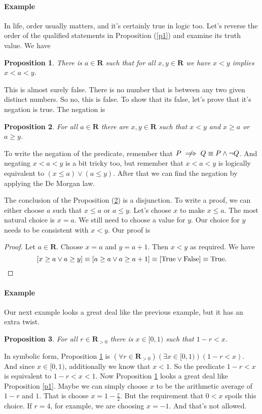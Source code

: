 \documentclass[12pt,fleqn]{article}
\newcommand{\reals}{\mathbf{R}}
\newcommand{\true}{\mathrm{True}}
\newcommand{\false}{\mathrm{False}}
\newcommand{\notimplies}{\centernot\implies}
\newenvironment{myproof}
  {\begin{shaded}\begin{proof}}
  {\end{proof}\end{shaded}}
\newtheorem{prop}{Proposition}
\newcounter{ex}\setcounter{ex}{0}
\newcommand{\ex}{%
\setcounter{ex}{\value{ex}+1}
\paragraph{Example \theex}}
\begin{document}
 \ex In life, order usually matters, and it's certainly true in logic too.
 Let's reverse the order of the qualified statements in Proposition 
 (\ref{p1}) and examine its truth value. We have 

 \begin{prop}
  There is $a \in \reals$ such that for all $x,y \in \reals$ we have
    $x < y$ implies $x<a<y$. \label{p2}   
\end{prop}
This is almost surely false. There is no number that is between 
any two given distinct numbers. So no, this is false. To show that its false,
let's prove that it's negation is true. The negation is

\begin{prop}
  For all $a \in \reals$ there are  $x,y \in \reals$ such that
    $x < y$ and  $x \geq a$ or $a \geq y$. \label{p3} 
\end{prop}
To write the negation of the predicate, remember that
$P \notimplies Q \equiv P \land \lnot Q$. And negating $x<a<y$ is 
a bit tricky too, but remember that 
$x<a<y$ is logically equivalent to $(x \leq a) \lor (a \leq y)$. After that 
we can find the negation by applying the De Morgan law.

The conclusion of the Proposition (\ref{p3}) is a disjunction.
To write a proof, we can either choose $a$ such that $x \leq a$
or $a \leq y$. Let's choose $x$ to make  $x \leq a$. The most
natural choice is $x = a$. We still need to choose a value for $y$.
Our choice for $y$ needs to be consistent with $x < y$. Our proof is

\begin{myproof} Let $a \in \reals$.  Choose $x=a$ and $y=a+1$.
  Then $x < y$ as required. We have
  \begin{equation*}
    \left[x \geq a \lor  a \geq y \right] 
    \equiv \left[a \geq a \lor  a \geq a+1 \right]
    \equiv \left[\true  \lor  \false  \right]
    \equiv \true. \qedhere
  \end{equation*}
\end{myproof}

\ex Our next example looks a great deal like the previous example, 
but it has an extra twist.
\begin{prop} 
     For all $r \in \reals_{>0}$ there is $x \in [0,1)$ such that $1-r < x$.  \label{p4}
\end{prop}

In symbolic form, Proposition \ref{p2} is $\left(\forall r  \in \reals_{>0} \right) \left(\exists x \in [0,1)\right) \left (1-r  < x \right)$.
And since $x \in [0,1)$, additionally we know that $x < 1$.  So the predicate $1-r  < x$ is equivalent to $1-r  < x  < 1$. Now Proposition \ref{p2}
looks a great deal like  Proposition \ref{p1}. Maybe we can simply choose $x$ to be the arithmetic average of $1-r$ and $1$. That is
choose $x = 1 - \frac{r}{2}$.  But the requirement that $0 < x$ spoils this choice. If $r = 4$, for example, we are choosing $x = -1$. And that's 
not allowed.    
\end{document}
